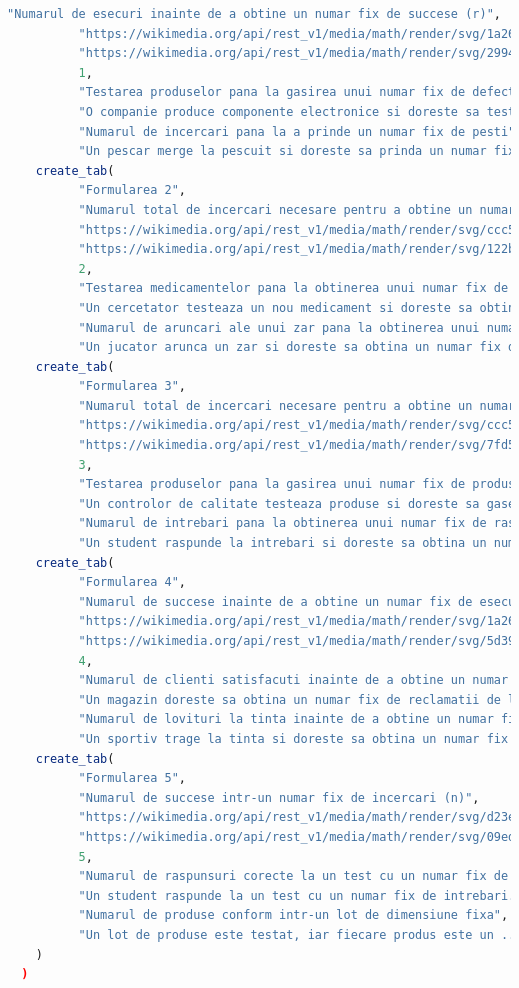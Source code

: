 \documentclass[a4paper,11pt]{article}
\begin{document}
\begin{lstlisting}[language=R]
          "Numarul de esecuri inainte de a obtine un numar fix de succese (r)", 
          "https://wikimedia.org/api/rest_v1/media/math/render/svg/1a26b86be5f2...",
          "https://wikimedia.org/api/rest_v1/media/math/render/svg/29944ccb6e33...",
          1,
          "Testarea produselor pana la gasirea unui numar fix de defecte",
          "O companie produce componente electronice si doreste sa testeze cate ...",
          "Numarul de incercari pana la a prinde un numar fix de pesti",
          "Un pescar merge la pescuit si doreste sa prinda un numar fix de pesti..."),
    create_tab(
          "Formularea 2", 
          "Numarul total de incercari necesare pentru a obtine un numar fix ...",
          "https://wikimedia.org/api/rest_v1/media/math/render/svg/ccc5e37984e75...",
          "https://wikimedia.org/api/rest_v1/media/math/render/svg/122b97516ba76...",
          2,
          "Testarea medicamentelor pana la obtinerea unui numar fix de ...",
          "Un cercetator testeaza un nou medicament si doreste sa obtina un numar ...",
          "Numarul de aruncari ale unui zar pana la obtinerea unui numar fix de sase",
          "Un jucator arunca un zar si doreste sa obtina un numar fix de sase..."),
    create_tab(
          "Formularea 3",
          "Numarul total de incercari necesare pentru a obtine un numar ...",
          "https://wikimedia.org/api/rest_v1/media/math/render/svg/ccc5e37984e...",
          "https://wikimedia.org/api/rest_v1/media/math/render/svg/7fd538f62a6...",
          3,
          "Testarea produselor pana la gasirea unui numar fix de produse neconforme",
          "Un controlor de calitate testeaza produse si doreste sa gaseasca un ...",
          "Numarul de intrebari pana la obtinerea unui numar fix de raspunsuri gresite",
          "Un student raspunde la intrebari si doreste sa obtina un numar fix ...",
    create_tab(
          "Formularea 4",
          "Numarul de succese inainte de a obtine un numar fix de esecuri (r)",
          "https://wikimedia.org/api/rest_v1/media/math/render/svg/1a26b86be5f...",
          "https://wikimedia.org/api/rest_v1/media/math/render/svg/5d39d1344ae...",
          4,
          "Numarul de clienti satisfacuti inainte de a obtine un numar fix de ...",
          "Un magazin doreste sa obtina un numar fix de reclamatii de la clienti. ...",
          "Numarul de lovituri la tinta inainte de a obtine un numar fix de rateuri",
          "Un sportiv trage la tinta si doreste sa obtina un numar fix de rateuri..."),
    create_tab(
          "Formularea 5",
          "Numarul de succese intr-un numar fix de incercari (n)",
          "https://wikimedia.org/api/rest_v1/media/math/render/svg/d23e3ebeb017f...",
          "https://wikimedia.org/api/rest_v1/media/math/render/svg/09ed5ae47e20d...",
          5,
          "Numarul de raspunsuri corecte la un test cu un numar fix de intrebari",
          "Un student raspunde la un test cu un numar fix de intrebari. Fiecare ...",
          "Numarul de produse conform intr-un lot de dimensiune fixa",
          "Un lot de produse este testat, iar fiecare produs este un ...")
    )
  )
\end{lstlisting}
\end{document}
